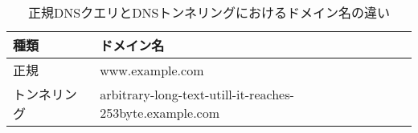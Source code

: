 \begin{table}[h]
 \caption{正規DNSクエリとDNSトンネリングにおけるドメイン名の違い}
 \centering
  \begin{tabular}{l|l}
    \toprule
    \textbf{種類} & \textbf{ドメイン名} \\
    \midrule
    正規 &  www.example.com \\ \hline
    トンネリング & arbitrary-long-text-utill-it-reaches-253byte.example.com\\
    \bottomrule
  \end{tabular}
 \label{tab:feature-tunnel}
\end{table}
